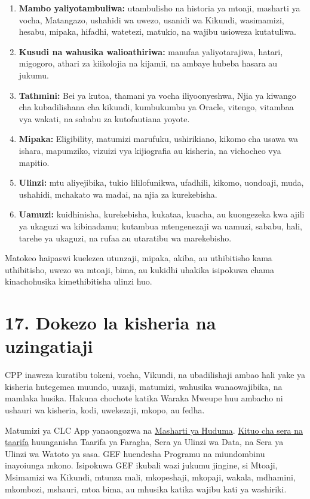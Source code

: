 \documentclass[11pt]{article}
\begin{document}
\begin{enumerate}[leftmargin=*]
\item \textbf{Mambo yaliyotambuliwa:} utambulisho na historia ya mtoaji, masharti ya vocha, Matangazo, ushahidi wa uwezo, usanidi wa Kikundi, wasimamizi, hesabu, mipaka, hifadhi, watetezi, matukio, na wajibu usioweza kutatuliwa.
\item \textbf{Kusudi na wahusika walioathiriwa:} manufaa yaliyotarajiwa, hatari, migogoro, athari za kiikolojia na kijamii, na ambaye hubeba hasara au jukumu.
\item \textbf{Tathmini:} Bei ya kutoa, thamani ya vocha iliyoonyeshwa, Njia ya kiwango cha kubadilishana cha kikundi, kumbukumbu ya Oracle, vitengo, vitambaa vya wakati, na sababu za kutofautiana yoyote.
\item \textbf{Mipaka:} Eligibility, matumizi marufuku, ushirikiano, kikomo cha usawa wa ishara, mapumziko, vizuizi vya kijiografia au kisheria, na vichocheo vya mapitio.
\item \textbf{Ulinzi:} mtu aliyejibika, tukio lililofunikwa, ufadhili, kikomo, uondoaji, muda, ushahidi, mchakato wa madai, na njia za kurekebisha.
\item \textbf{Uamuzi:} kuidhinisha, kurekebisha, kukataa, kuacha, au kuongezeka kwa ajili ya ukaguzi wa kibinadamu; kutambua mtengenezaji wa uamuzi, sababu, hali, tarehe ya ukaguzi, na rufaa au utaratibu wa marekebisho.
\end{enumerate}
Matokeo haipaswi kuelezea utunzaji, mipaka, akiba, au uthibitisho kama uthibitisho, uwezo wa mtoaji, bima, au kukidhi uhakika isipokuwa chama kinachohusika kimethibitisha ulinzi huo.


\section*{17. Dokezo la kisheria na uzingatiaji}

CPP inaweza kuratibu tokeni, vocha, Vikundi, na ubadilishaji ambao hali yake ya kisheria hutegemea muundo, uuzaji, matumizi, wahusika wanaowajibika, na mamlaka husika. Hakuna chochote katika Waraka Mweupe huu ambacho ni ushauri wa kisheria, kodi, uwekezaji, mkopo, au fedha.

Matumizi ya CLC App yanaongozwa na \href{https://docs.cosmolocal.credit/sw/governance/terms}{Masharti ya Huduma}. \href{https://docs.cosmolocal.credit/sw/governance/policies}{Kituo cha sera na taarifa} huunganisha Taarifa ya Faragha, Sera ya Ulinzi wa Data, na Sera ya Ulinzi wa Watoto ya sasa. GEF huendesha Programu na miundombinu inayoiunga mkono. Isipokuwa GEF ikubali wazi jukumu jingine, si Mtoaji, Msimamizi wa Kikundi, mtunza mali, mkopeshaji, mkopaji, wakala, mdhamini, mkombozi, mshauri, mtoa bima, au mhusika katika wajibu kati ya washiriki.
\end{document}
